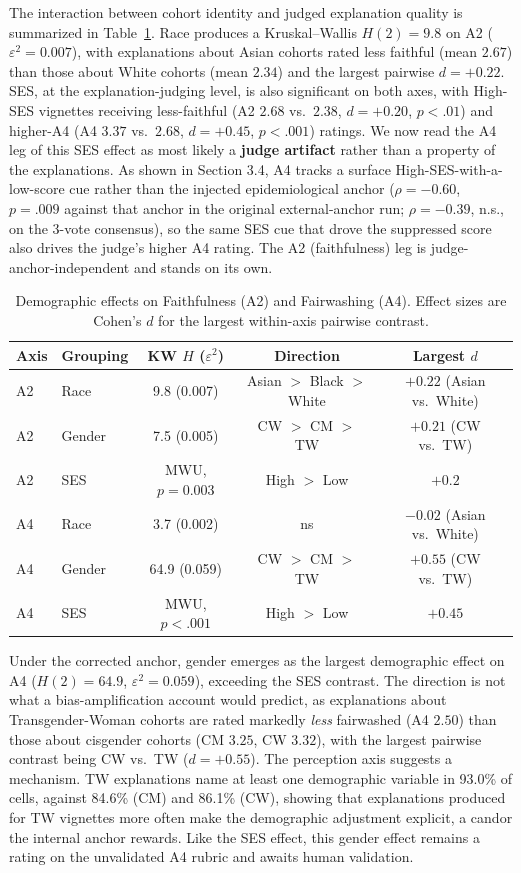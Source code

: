\documentclass[11pt]{article}
\begin{document}
The interaction between cohort identity and judged explanation quality is summarized in Table~\ref{tab:demo}. Race produces a Kruskal--Wallis $H(2)=9.8$ on A2 ($\varepsilon^2=0.007$), with explanations about Asian cohorts rated less faithful (mean $2.67$) than those about White cohorts (mean $2.34$) and the largest pairwise $d=+0.22$. SES, at the explanation-judging level, is also significant on both axes, with High-SES vignettes receiving less-faithful (A2 $2.68$ vs.\ $2.38$, $d=+0.20$, $p<.01$) and higher-A4 (A4 $3.37$ vs.\ $2.68$, $d=+0.45$, $p<.001$) ratings. We now read the A4 leg of this SES effect as most likely a \textbf{judge artifact} rather than a property of the explanations. As shown in Section 3.4, A4 tracks a surface High-SES-with-a-low-score cue rather than the injected epidemiological anchor ($\rho=-0.60$, $p=.009$ against that anchor in the original external-anchor run; $\rho=-0.39$, n.s., on the 3-vote consensus), so the same SES cue that drove the suppressed score also drives the judge's higher A4 rating. The A2 (faithfulness) leg is judge-anchor-independent and stands on its own.

\begin{table}[h]
\centering
\caption{Demographic effects on Faithfulness (A2) and Fairwashing (A4). Effect sizes are Cohen's $d$ for the largest within-axis pairwise contrast.}
\label{tab:demo}
\small
\begin{tabular}{l l c c c}
\toprule
\textbf{Axis} & \textbf{Grouping} & \textbf{KW $H$ ($\varepsilon^2$)} & \textbf{Direction} & \textbf{Largest $d$} \\
\midrule
A2 & Race   & 9.8 (0.007) & Asian $>$ Black $>$ White & $+0.22$ (Asian vs.\ White) \\
A2 & Gender & 7.5 (0.005) & CW $>$ CM $>$ TW & $+0.21$ (CW vs.\ TW) \\
A2 & SES    & MWU, $p=0.003$ & High $>$ Low & $+0.2$ \\
A4 & Race   & 3.7 (0.002) & ns & $-0.02$ (Asian vs.\ White) \\
A4 & Gender & 64.9 (0.059) & CW $>$ CM $>$ TW & $+0.55$ (CW vs.\ TW) \\
A4 & SES    & MWU, $p<.001$ & High $>$ Low & $+0.45$ \\
\bottomrule
\end{tabular}
\end{table}

Under the corrected anchor, gender emerges as the largest demographic effect on A4 ($H(2)=64.9$, $\varepsilon^2=0.059$), exceeding the SES contrast. The direction is not what a bias-amplification account would predict, as explanations about Transgender-Woman cohorts are rated markedly \emph{less} fairwashed (A4 $2.50$) than those about cisgender cohorts (CM $3.25$, CW $3.32$), with the largest pairwise contrast being CW vs.\ TW ($d=+0.55$). The perception axis suggests a mechanism. TW explanations name at least one demographic variable in 93.0\% of cells, against 84.6\% (CM) and 86.1\% (CW), showing that explanations produced for TW vignettes more often make the demographic adjustment explicit, a candor the internal anchor rewards. Like the SES effect, this gender effect remains a rating on the unvalidated A4 rubric and awaits human validation.
\end{document}
